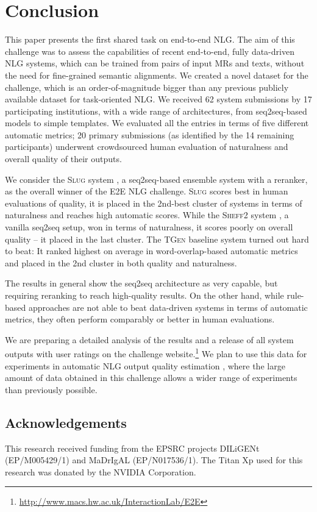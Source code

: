 \documentclass[11pt,a4paper]{article}
\newcommand\tgen{\textsc{TGen}\xspace}
\newcommand\slug{\textsc{Slug}\xspace}
\newcommand\sheffii{\textsc{Sheff2}\xspace}
\begin{document}
\section{Conclusion}\label{sec:conclusion}

This paper presents the first shared task on end-to-end NLG. 
The aim of this challenge was to assess the capabilities of recent end-to-end, fully data-driven NLG systems, which can be trained from pairs of input MRs and texts, without the need for fine-grained semantic alignments.
We created a novel dataset for the challenge, which is an order-of-magnitude bigger than any previous publicly available dataset for task-oriented NLG. 
We received 62 system submissions by 17 participating institutions,
with a wide range of architectures, from seq2seq-based models to simple templates.
We evaluated all the entries in terms of five different automatic metrics; 20 primary submissions (as identified by the 14 remaining participants) underwent crowdsourced human evaluation of naturalness and overall quality of their outputs.
 
We consider the \slug system \cite{juraska_slug2slug:_2018}, a seq2seq-based ensemble system with a reranker, as the overall winner of the E2E NLG challenge.
\slug scores best in human evaluations of quality, it is placed in the 2nd-best cluster of systems in terms of naturalness and reaches high automatic scores. 
While the \sheffii system \cite{chen_shefeld_2018}, a vanilla seq2seq setup, won in terms of naturalness, it scores poorly on overall quality -- it placed in the last cluster. 
The \tgen baseline system turned out hard to beat: It ranked highest on average in word-overlap-based automatic metrics and placed in the 2nd cluster in both quality and naturalness.

The results in general show the seq2seq architecture as very capable, but requiring reranking to reach high-quality results.
On the other hand, while rule-based approaches are not able to beat data-driven systems in terms of automatic metrics, they often perform comparably or better in human evaluations.



We are preparing a detailed analysis of the results \cite{dusek2018e2e} and a release of all system outputs with user ratings on the challenge website.\footnote{\url{http://www.macs.hw.ac.uk/InteractionLab/E2E}} We plan to use this data for experiments in automatic NLG output quality estimation \cite{specia:MT2010,dusek_referenceless_2017}, where the large amount of data obtained in this challenge allows a wider range of experiments than previously possible.

\subsection*{Acknowledgements}

This research received funding from the EPSRC projects  DILiGENt (EP/M005429/1) and  MaDrIgAL (EP/N017536/1). The Titan Xp used for this research was donated by the NVIDIA Corporation.



\end{document}
